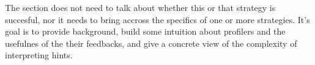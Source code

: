 The section does not need to talk about whether this or that strategy is
succesful, nor it needs to bring accross the specifics of one or more
strategies. It's goal is to provide background, build some intuition about
profilers and the usefulnes of the their feedbacks, and give a concrete view of
 the complexity of interpreting hints.

